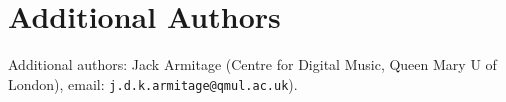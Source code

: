 \documentclass{nime-alternate}
\begin{document}
\section{Additional Authors}
Additional authors: Jack Armitage (Centre for Digital Music, Queen Mary U of London),
email: {\texttt{j.d.k.armitage@qmul.ac.uk}}).
\date{27 January 2018}

%

%
%
\end{document}
